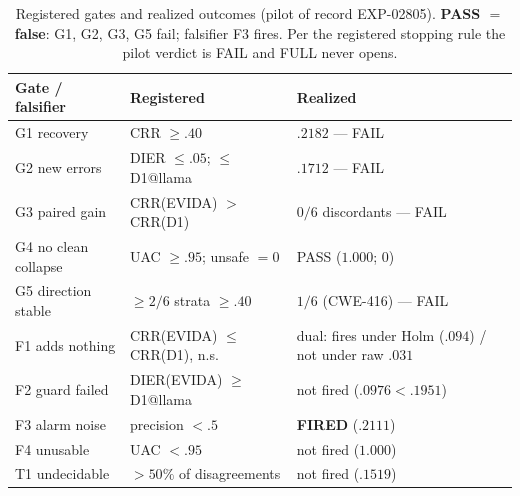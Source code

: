 \documentclass[sigconf,nonacm]{acmart}
\begin{document}
\begin{table}[t]
\centering\small
\caption{Registered gates and realized outcomes (pilot of record EXP-02805).
\textbf{PASS $=$ false}: G1, G2, G3, G5 fail; falsifier F3 fires. Per the
registered stopping rule the pilot verdict is FAIL and FULL never opens.}
\label{tab:gates}
\begin{tabular}{lll}
\toprule
Gate / falsifier & Registered & Realized \\
\midrule
G1 recovery & CRR $\ge .40$ & $.2182$ --- FAIL \\
G2 new errors & DIER $\le .05$; $\le$ D1@llama & $.1712$ --- FAIL \\
G3 paired gain & CRR(EVIDA) $>$ CRR(D1) & $0/6$ discordants --- FAIL \\
G4 no clean collapse & UAC $\ge .95$; unsafe $=0$ & PASS ($1.000$; $0$) \\
G5 direction stable & ${\ge}2/6$ strata $\ge .40$ & $1/6$ (CWE-416) --- FAIL \\
\midrule
F1 adds nothing & CRR(EVIDA) $\le$ CRR(D1), n.s. & dual: fires under Holm ($.094$) / not under raw $.031$ \\
F2 guard failed & DIER(EVIDA) $\ge$ D1@llama & not fired ($.0976<.1951$) \\
F3 alarm noise & precision $<.5$ & \textbf{FIRED} ($.2111$) \\
F4 unusable & UAC $<.95$ & not fired ($1.000$) \\
T1 undecidable & $>50\%$ of disagreements & not fired ($.1519$) \\
\bottomrule
\end{tabular}
\end{table}
\end{document}
